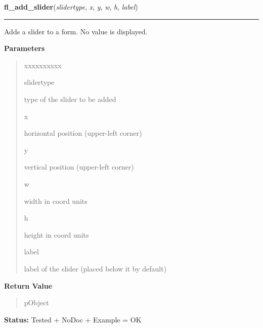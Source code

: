     \label{xformslib:library:fl_add_slider}

    \vspace{0.5ex}

\hspace{.8\funcindent}\begin{boxedminipage}{\funcwidth}

    \raggedright \textbf{fl\_add\_slider}(\textit{slidertype}, \textit{x}, \textit{y}, \textit{w}, \textit{h}, \textit{label})

    \vspace{-1.5ex}

    \rule{\textwidth}{0.5\fboxrule}
\setlength{\parskip}{2ex}
    Adds a slider to a form. No value is displayed.

\setlength{\parskip}{1ex}
      \textbf{Parameters}
      \vspace{-1ex}

      \begin{quote}
        \begin{Ventry}{xxxxxxxxxx}

          \item[slidertype]

          type of the slider to be added

          \item[x]

          horizontal position (upper-left corner)

          \item[y]

          vertical position (upper-left corner)

          \item[w]

          width in coord units

          \item[h]

          height in coord units

          \item[label]

          label of the slider (placed below it by default)

        \end{Ventry}

      \end{quote}

      \textbf{Return Value}
    \vspace{-1ex}

      \begin{quote}
      pObject

      \end{quote}

\textbf{Status:} Tested + NoDoc + Example = OK



    \end{boxedminipage}

